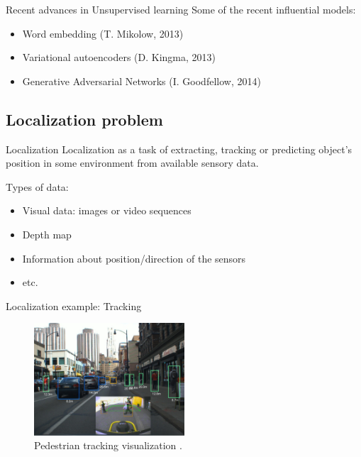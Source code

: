 \documentclass[pdftex]{beamer}
\begin{document}
\begin{frame}{Recent advances in Unsupervised learning}
  Some of the recent influential models:
  \begin{itemize}
    \item Word embedding (T. Mikolow, 2013)
    \item Variational autoencoders (D. Kingma, 2013)
    \item Generative Adversarial Networks (I. Goodfellow, 2014)
  \end{itemize}
\end{frame}


\subsection{Localization problem}


\begin{frame}{Localization}
  Localization as a task of extracting, tracking or predicting object's position in some environment from available sensory data.

  \pause
\vspace{1cm}
  Types of data:
  \begin{itemize}
    \item Visual data: images or video sequences
    \item Depth map
    \item Information about position/direction of the sensors
    \item etc.
  \end{itemize}
\end{frame}

\begin{frame}{Localization example: Tracking}
  \begin{figure}
  \includegraphics[width=0.5\textwidth,height=0.5\textheight,keepaspectratio]{images/tracking.png}
\caption{Pedestrian tracking visualization \footnotemark.}
\end{figure}

\end{frame}
\end{document}

